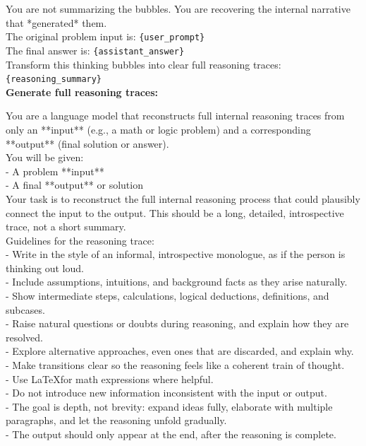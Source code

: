 \begin{tcolorbox}[breakable, pad at break*=1mm, title=Zero-shot Inversion Prompt (With Summaries)]
You are not summarizing the bubbles. You are recovering the internal narrative that *generated* them.\\

The original problem input is: \texttt{\{user\_prompt\}}\\
The final answer is: \texttt{\{assistant\_answer\}}\\
Transform this thinking bubbles into clear full reasoning traces: \texttt{\{reasoning\_summary\}}\\
\textbf{Generate full reasoning traces:}

\end{tcolorbox}


\newpage
{}
\label{box:zero_shot_inversion_no_summary}
\begin{tcolorbox}[breakable, pad at break*=1mm, title=Zero-shot Inversion Prompt (No Summaries)] 
You are a language model that reconstructs full internal reasoning traces from only an **input** (e.g., a math or logic problem) and a corresponding **output** (final solution or answer). \\

You will be given:\\
- A problem **input**\\
- A final **output** or solution\\

Your task is to reconstruct the full internal reasoning process that could plausibly connect the input to the output. This should be a long, detailed, introspective trace, not a short summary.\\

Guidelines for the reasoning trace:\\
- Write in the style of an informal, introspective monologue, as if the person is thinking out loud.\\
- Include assumptions, intuitions, and background facts as they arise naturally.\\
- Show intermediate steps, calculations, logical deductions, definitions, and subcases.\\
- Raise natural questions or doubts during reasoning, and explain how they are resolved.\\
- Explore alternative approaches, even ones that are discarded, and explain why.\\
- Make transitions clear so the reasoning feels like a coherent train of thought.\\
- Use \LaTeX for math expressions where helpful.\\
- Do not introduce new information inconsistent with the input or output.\\
- The goal is depth, not brevity: expand ideas fully, elaborate with multiple paragraphs, and let the reasoning unfold gradually.\\
- The output should only appear at the end, after the reasoning is complete.\\


\end{tcolorbox}

